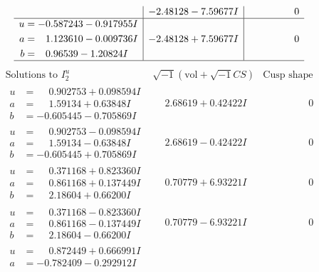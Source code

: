 \documentclass[1p]{elsarticle_modified}
\theoremstyle{definition}
\newcommand{\I}{\sqrt{-1}}
\begin{document}
$$\begin{array}{c|c|c}
 & -2.48128 - 7.59677 I & \phantom{-0.000000 } 0 \\ \hline\begin{aligned}
u &= -0.587243 - 0.917955 I \\
a &= \phantom{-}1.123610 - 0.009736 I \\
b &= \phantom{-}0.96539 - 1.20824 I\end{aligned}
 & -2.48128 + 7.59677 I & \phantom{-0.000000 } 0\\
 \hline 
 \end{array}$$\newpage$$\begin{array}{c|c|c}  
\text{Solutions to }I^u_{2}& \I (\text{vol} + \sqrt{-1}CS) & \text{Cusp shape}\\
 \hline 
\begin{aligned}
u &= \phantom{-}0.902753 + 0.098594 I \\
a &= \phantom{-}1.59134 + 0.63848 I \\
b &= -0.605445 - 0.705869 I\end{aligned}
 & \phantom{-}2.68619 + 0.42422 I & \phantom{-0.000000 } 0 \\ \hline\begin{aligned}
u &= \phantom{-}0.902753 - 0.098594 I \\
a &= \phantom{-}1.59134 - 0.63848 I \\
b &= -0.605445 + 0.705869 I\end{aligned}
 & \phantom{-}2.68619 - 0.42422 I & \phantom{-0.000000 } 0 \\ \hline\begin{aligned}
u &= \phantom{-}0.371168 + 0.823360 I \\
a &= \phantom{-}0.861168 + 0.137449 I \\
b &= \phantom{-}2.18604 + 0.66200 I\end{aligned}
 & \phantom{-}0.70779 + 6.93221 I & \phantom{-0.000000 } 0 \\ \hline\begin{aligned}
u &= \phantom{-}0.371168 - 0.823360 I \\
a &= \phantom{-}0.861168 - 0.137449 I \\
b &= \phantom{-}2.18604 - 0.66200 I\end{aligned}
 & \phantom{-}0.70779 - 6.93221 I & \phantom{-0.000000 } 0 \\ \hline\begin{aligned}
u &= \phantom{-}0.872449 + 0.666991 I \\
a &= -0.782409 - 0.292912 I \\

\end{aligned}
\end{array}$$
\end{document}
